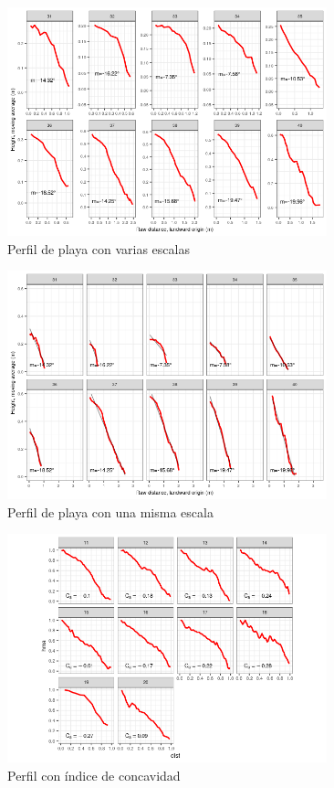 \documentclass[11pt,]{article}
\begin{document}
\begin{figure}
\centering
\includegraphics[height=2.60417in]{dimension_31-40.png}
\caption{Perfil de playa con varias escalas\label{pendiente}}
\end{figure}

\begin{figure}
\centering
\includegraphics[height=2.60417in]{escala_diferente_consistente_31-40.png}
\caption{Perfil de playa con una misma escala\label{consistente}}
\end{figure}

\begin{figure}
\centering
\includegraphics[height=2.60417in]{indice_concavidad.png}
\caption{Perfil con índice de concavidad\label{concavidad}}
\end{figure}
\end{document}
